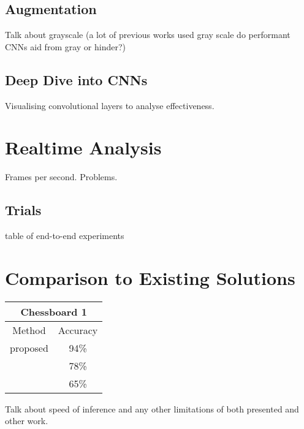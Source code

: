 \subsection{Augmentation}
Talk about grayscale (a lot of previous works used gray scale do performant CNNs aid from gray or hinder?)

\subsection{Deep Dive into CNNs}
Visualising convolutional layers to analyse effectiveness.

\section{Realtime Analysis}
Frames per second.  Problems.

\subsection{Trials}
table of end-to-end experiments

\section{Comparison to Existing Solutions}
\begin{center}
\begin{tabular}{|c|c|}
    \multicolumn{2}{c}{Chessboard 1} \\
    \hline
    Method & Accuracy \\
    \hline
    proposed & 94\% \\
    \cite{} & 78\% \\
    \cite{} & 65\%  \\
    \hline
\end{tabular}
\end{center}

Talk about speed of inference and any other limitations of both presented and other work.